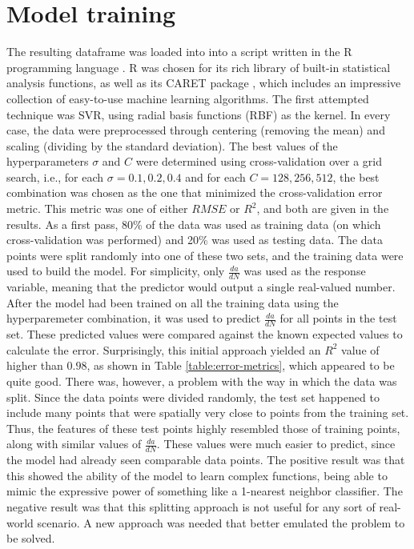 \section{Model training}
The resulting dataframe was loaded into into a script written in the R programming language \cite{statistical2009r}.  R was chosen for its rich library of built-in statistical analysis functions, as well as its CARET package \cite{caret2008}, which includes an impressive collection of easy-to-use machine learning algorithms.  The first attempted technique was SVR, using radial basis functions (RBF) as the kernel.  In every case, the data were preprocessed through centering (removing the mean) and scaling (dividing by the standard deviation).  The best values of the hyperparameters $\sigma$ and $C$ were determined using cross-validation over a grid search, i.e., for each $\sigma = 0.1, 0.2, 0.4$ and for each $C = 128, 256, 512$, the best combination was chosen as the one that minimized the cross-validation error metric.  This metric was one of either $RMSE$ or $R^2$, and both are given in the results.  As a first pass, 80\% of the data was used as training data (on which cross-validation was performed) and 20\% was used as testing data.  The data points were split randomly into one of these two sets, and the training data were used to build the model.  For simplicity, only $\frac{da}{dN}$ was used as the response variable, meaning that the predictor would output a single real-valued number.  After the model had been trained on all the training data using the hyperparemeter combination, it was used to predict $\frac{da}{dN}$ for all points in the test set.  These predicted values were compared against the known expected values to calculate the error.  Surprisingly, this initial approach yielded an $R^2$ value of higher than $0.98$, as shown in Table \ref{table:error-metrics}, which appeared to be quite good.  There was, however, a problem with the way in which the data was split.  Since the data points were divided randomly, the test set happened to include many points that were spatially very close to points from the training set.  Thus, the features of these test points highly resembled those of training points, along with similar values of $\frac{da}{dN}$.  These values were much easier to predict, since the model had already seen comparable data points.  The positive result was that this showed the ability of the model to learn complex functions, being able to mimic the expressive power of something like a 1-nearest neighbor classifier.  The negative result was that this splitting approach is not useful for any sort of real-world scenario.  A new approach was needed that better emulated the problem to be solved.

